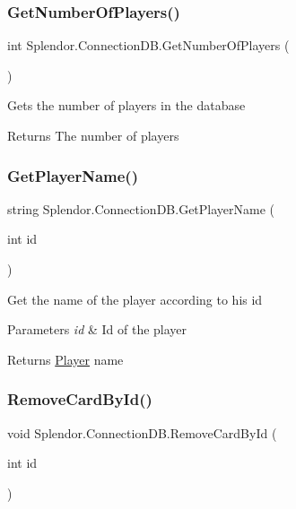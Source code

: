 \subsubsection{\texorpdfstring{Get\+Number\+Of\+Players()}{GetNumberOfPlayers()}}
{\footnotesize\ttfamily int Splendor.\+Connection\+D\+B.\+Get\+Number\+Of\+Players (\begin{DoxyParamCaption}{ }\end{DoxyParamCaption})}



Gets the number of players in the database 

\begin{DoxyReturn}{Returns}
The number of players
\end{DoxyReturn}
\mbox{\label{class_splendor_1_1_connection_d_b_a7d715d5452049ad06f4a407fa5df151c}} 
\subsubsection{\texorpdfstring{Get\+Player\+Name()}{GetPlayerName()}}
{\footnotesize\ttfamily string Splendor.\+Connection\+D\+B.\+Get\+Player\+Name (\begin{DoxyParamCaption}\item[{int}]{id }\end{DoxyParamCaption})}



Get the name of the player according to his id 


\begin{DoxyParams}{Parameters}
{\em id} & Id of the player\\
\hline
\end{DoxyParams}
\begin{DoxyReturn}{Returns}
\hyperlink{class_splendor_1_1_player}{Player} name
\end{DoxyReturn}
\mbox{\label{class_splendor_1_1_connection_d_b_a00d157ae467fdd310bf38626472175b6}} 
\subsubsection{\texorpdfstring{Remove\+Card\+By\+Id()}{RemoveCardById()}}
{\footnotesize\ttfamily void Splendor.\+Connection\+D\+B.\+Remove\+Card\+By\+Id (\begin{DoxyParamCaption}\item[{int}]{id }\end{DoxyParamCaption})}



